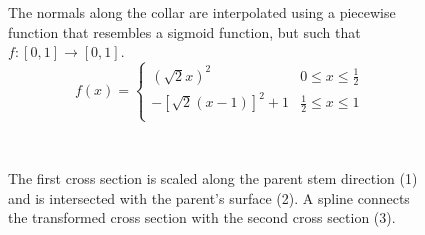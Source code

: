 \documentclass[10pt]{article}
\begin{document}
\begin{figure}[H]
 \begin{minipage}[H]{0.46\textwidth}
The normals along the collar are interpolated using a piecewise function that resembles a sigmoid function, but such that $ f: \left[ 0, 1 \right] \rightarrow \left[ 0, 1 \right] $.
\[ f(x) =
\begin{cases}
(\sqrt{2}x)^2 & 0 \leq x \leq \frac{1}{2}\\
-\left[\sqrt{2}(x-1)\right]^2 + 1 & \frac{1}{2} \leq x \leq 1 \\
\end{cases} \]
 \end{minipage}
 \hfill
 \begin{minipage}[H]{0.46\textwidth}
  \centering
   \\
  \caption{The first cross section is scaled along the parent stem direction (1) and is intersected with the parent's surface (2). A spline connects the transformed cross section with the second cross section (3).}
 \end{minipage}
\end{figure}
\end{document}
